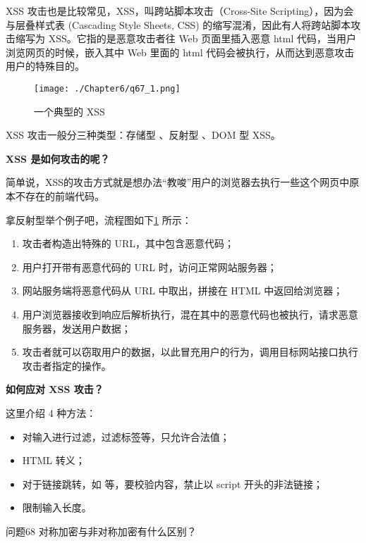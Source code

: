 \documentclass[cn,11pt,color=blue,lang=cn]{elegantbook}
\begin{document}
\begin{solution}
XSS 攻击也是比较常见，XSS，叫跨站脚本攻击（Cross-Site Scripting），因为会与层叠样式表 (Cascading Style Sheets, CSS) 的缩写混淆，因此有人将跨站脚本攻击缩写为 XSS。它指的是恶意攻击者往 Web 页面里插入恶意 html 代码，当用户浏览网页的时候，嵌入其中 Web 里面的 html 代码会被执行，从而达到恶意攻击用户的特殊目的。

\begin{figure}[!h]
\centering
\texttt{[image: ./Chapter6/q67\_1.png]}
\caption{一个典型的 XSS}
\label{fig67_1}
\end{figure}

XSS 攻击一般分三种类型：存储型 、反射型 、DOM 型 XSS。
\begin{note} \textbf{XSS 是如何攻击的呢？} \end{note}
简单说，XSS的攻击方式就是想办法“教唆”用户的浏览器去执行一些这个网页中原本不存在的前端代码。

拿反射型举个例子吧，流程图如下\ref{fig67_1} 所示：
\begin{enumerate}
	\item 攻击者构造出特殊的 URL，其中包含恶意代码；
	\item 用户打开带有恶意代码的 URL 时，访问正常网站服务器；
	\item 网站服务端将恶意代码从 URL 中取出，拼接在 HTML 中返回给浏览器；
	\item 用户浏览器接收到响应后解析执行，混在其中的恶意代码也被执行，请求恶意服务器，发送用户数据；
	\item 攻击者就可以窃取用户的数据，以此冒充用户的行为，调用目标网站接口执行攻击者指定的操作。
\end{enumerate}

\begin{note} \textbf{如何应对 XSS 攻击？} \end{note}
这里介绍 4 种方法：
\begin{itemize}
	\item 对输入进行过滤，过滤标签等，只允许合法值；
	\item HTML 转义；
	\item 对于链接跳转，如  等，要校验内容，禁止以 script 开头的非法链接；
	\item 限制输入长度。
\end{itemize}
\end{solution}


\begin{custom}{问题68}
对称加密与非对称加密有什么区别？
\end{custom}
\end{document}
